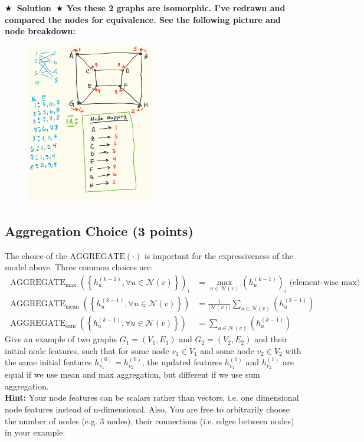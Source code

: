 \documentclass{article}
\numberwithin{figure}{section}
\newcommand{\Solution}[1]{{\medskip \color{red} \bf $\bigstar$~\sf \textbf{Solution}~$\bigstar$ \sf #1 } \bigskip}
\begin{document}
\Solution{
Yes these 2 graphs are isomorphic. I've redrawn and compared the nodes for equivalence. See the following picture and node breakdown:
\begin{figure}[H]
        \centering
\centering \includegraphics[width=0.5\textwidth]{CS224W_Homework1/node_mapping.jpg}
        \end{figure}
}


\subsection{Aggregation Choice (3 points)} 
The choice of the $\operatorname{AGGREGATE(\cdot)}$ is important for the expressiveness of the model above. Three common choices are: $$
\begin{aligned}
\operatorname{AGGREGATE}_{\max }\left(\left\{h_u^{(k-1)}, \forall u \in \mathcal{N}(v)\right\}\right)_i & =\max _{u \in \mathcal{N}(v)}\left(h_u^{(k-1)}\right)_i \text { (element-wise max)} \\
\operatorname{AGGREGATE}_{\text {mean}}\left(\left\{h_u^{(k-1)}, \forall u \in \mathcal{N}(v)\right\}\right) & =\frac{1}{|\mathcal{N}(v)|} \sum_{u \in \mathcal{N}(v)}\left(h_u^{(k-1)}\right) \\
\operatorname{AGGREGATE}_{\text {sum}}\left(\left\{h_u^{(k-1)}, \forall u \in \mathcal{N}(v)\right\}\right) & =\sum_{u \in \mathcal{N}(v)}\left(h_u^{(k-1)}\right)
\end{aligned}
$$
Give an example of two graphs $G_1 = (V_1, E_1)$ and $G_2 = (V_2, E_2)$ and their initial node features, such that for some node $v_1 \in V_1$ and some node $v_2 \in V_2$ with the same initial features $h^{(0)}_{v_1} = h^{(0)}_{v_2}$, the updated features $h^{(1)}_{v_1}$ and $h^{(1)}_{v_2}$ are equal if we use mean and max aggregation, but different if 
we use sum aggregation.\\
\textbf{Hint:} Your node features can be scalars rather than vectors, i.e. one dimensional node features instead of n-dimensional. Also, You are free to arbitrarily choose the number of nodes (e.g. 3 nodes), their connections (i.e. edges between
nodes) in your example.
\end{document}
